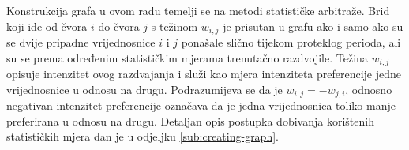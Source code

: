 \documentclass[lmodern, utf8, diplomski, numeric]{fer}
\begin{document}
  
  Konstrukcija grafa u ovom radu temelji se na metodi statističke arbitraže.
  Brid koji ide od čvora $i$ do čvora $j$ s težinom $w_{i,j}$ je prisutan u grafu ako i samo ako su se dvije pripadne vrijednosnice $i$ i $j$ ponašale slično tijekom proteklog perioda, ali su se prema određenim statističkim mjerama trenutačno razdvojile.
  Težina $w_{i,j}$ opisuje intenzitet ovog razdvajanja i služi kao mjera intenziteta preferencije jedne vrijednosnice u odnosu na drugu.
  Podrazumijeva se da je $w_{i,j} = -w_{j,i}$, odnosno negativan intenzitet preferencije označava da je jedna vrijednosnica toliko manje preferirana u odnosu na drugu.
  Detaljan opis postupka dobivanja korištenih statističkih mjera dan je u odjeljku \ref{sub:creating-graph}.
    
\end{document}
